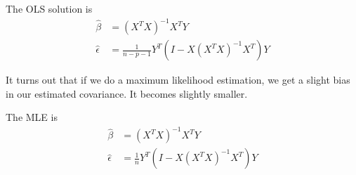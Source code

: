   \begin{theorem}
    The OLS solution is 
    \begin{align}
      \hat{\beta} & = (X^T X)^{-1} X^T Y \\ 
      \hat{\epsilon} & = \frac{1}{n - p - 1} Y^T (I - X (X^T X)^{-1} X^T) Y
    \end{align}
  \end{theorem} 

  It turns out that if we do a maximum likelihood estimation, we get a slight bias in our estimated covariance. It becomes slightly smaller. 

  \begin{theorem}
    The MLE is 
    \begin{align}
      \hat{\beta} & = (X^T X)^{-1} X^T Y \\ 
      \hat{\epsilon} & = \frac{1}{n} Y^T (I - X (X^T X)^{-1} X^T) Y
    \end{align}
  \end{theorem}



  

